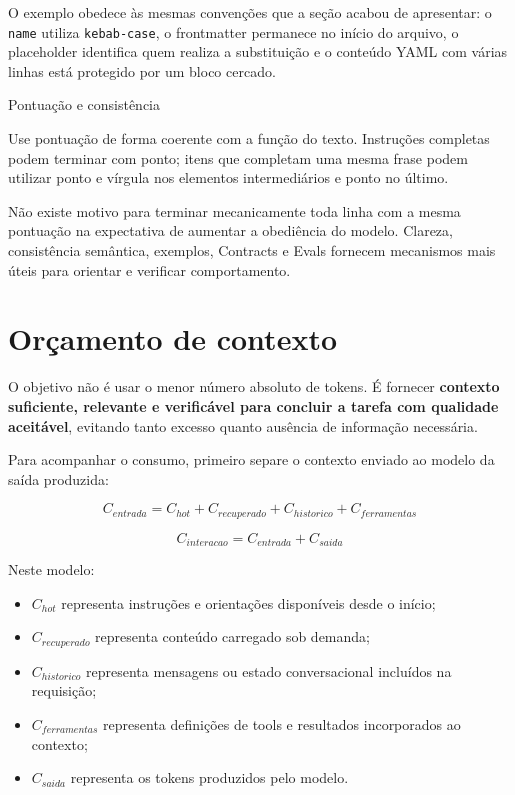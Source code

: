 \documentclass[
  10pt,
  a4paper,
  oneside]{book}
\providecommand{\tightlist}{%
  \setlength{\itemsep}{0pt}\setlength{\parskip}{0pt}}
\begin{document}
O exemplo obedece às mesmas convenções que a seção acabou de apresentar:
o \texttt{name} utiliza \texttt{kebab-case}, o frontmatter permanece no
início do arquivo, o placeholder identifica quem realiza a substituição
e o conteúdo YAML com várias linhas está protegido por um bloco cercado.

\begin{infobox}{Pontuação e consistência}

Use pontuação de forma coerente com a função do texto. Instruções
completas podem terminar com ponto; itens que completam uma mesma frase
podem utilizar ponto e vírgula nos elementos intermediários e ponto no
último.

Não existe motivo para terminar mecanicamente toda linha com a mesma
pontuação na expectativa de aumentar a obediência do modelo. Clareza,
consistência semântica, exemplos, Contracts e Evals fornecem mecanismos
mais úteis para orientar e verificar comportamento.

\end{infobox}

\hypertarget{oruxe7amento-de-contexto}{%
\section{Orçamento de contexto}\label{oruxe7amento-de-contexto}}

O objetivo não é usar o menor número absoluto de tokens. É fornecer
\textbf{contexto suficiente, relevante e verificável para concluir a
tarefa com qualidade aceitável}, evitando tanto excesso quanto ausência
de informação necessária.

Para acompanhar o consumo, primeiro separe o contexto enviado ao modelo
da saída produzida:

\[
C_{entrada} = C_{hot} + C_{recuperado} + C_{historico} + C_{ferramentas}
\]

\[
C_{interacao} = C_{entrada} + C_{saida}
\]

Neste modelo:

\begin{itemize}
\tightlist
\item
  \(C_{hot}\) representa instruções e orientações disponíveis desde o
  início;
\item
  \(C_{recuperado}\) representa conteúdo carregado sob demanda;
\item
  \(C_{historico}\) representa mensagens ou estado conversacional
  incluídos na requisição;
\item
  \(C_{ferramentas}\) representa definições de tools e resultados
  incorporados ao contexto;
\item
  \(C_{saida}\) representa os tokens produzidos pelo modelo.
\end{itemize}
\end{document}
